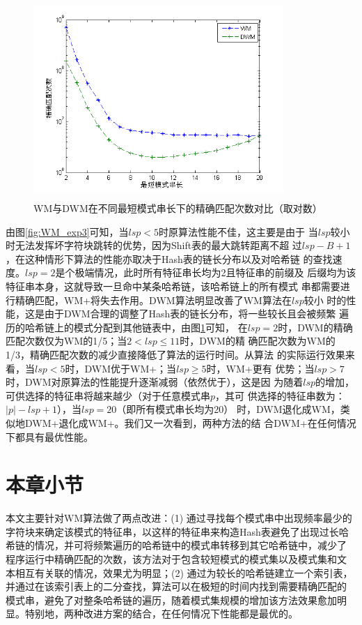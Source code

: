 \begin{figure}[H]
  \centering
  \includegraphics[height=7.5cm ,width=9.5cm]{figures/5_WM/WM_exp4.png}
  \caption{WM与DWM在不同最短模式串长下的精确匹配次数对比（取对数）}
  \label{fig:WM_exp4}
\end{figure}

由图\ref{fig:WM_exp3}可知，当$lsp<5$时原算法性能不佳，这主要是由于
当$lsp$较小时无法发挥坏字符块跳转的优势，因为Shift表的最大跳转距离不超
过$lsp-B+1$，在这种情形下算法的性能亦取决于Hash表的链长分布以及对哈希链
的查找速度。$lsp=2$是个极端情况，此时所有特征串长均为2且特征串的前缀及
后缀均为该特征串本身，这就导致一旦命中某条哈希链，该哈希链上的所有模式
串都需要进行精确匹配，WM+将失去作用。DWM算法明显改善了WM算法在$lsp$较小
时的性能，这是由于DWM合理的调整了Hash表的链长分布，将一些较长且会被频繁
遍历的哈希链上的模式分配到其他链表中，由图\ref{fig:WM_exp4}可知，
在$lsp=2$时，DWM的精确匹配次数仅为WM的1/5；当$2<lsp\leq 11$时，DWM的精
确匹配次数为WM的1/3，精确匹配次数的减少直接降低了算法的运行时间。从算法
的实际运行效果来看，当$lsp<5$时，DWM优于WM+；当$lsp \geq 5$时，WM+更有
优势；当$lsp > 7$时，DWM对原算法的性能提升逐渐减弱（依然优于），这是因
为随着$lsp$的增加，可供选择的特征串将越来越少（对于任意模式串$p$，其可
供选择的特征串数为：$|p|-lsp+1$），当$lsp=20$（即所有模式串长均为20）
时，DWM退化成WM，类似地DWM+退化成WM+。我们又一次看到，两种方法的结
合DWM+在任何情况下都具有最优性能。

\section{本章小节}
\label{sec:5_conclusion}

本文主要针对WM算法做了两点改进：(1) 通过寻找每个模式串中出现频率最少的
字符块来确定该模式的特征串，以这样的特征串来构造Hash表避免了出现过长哈
希链的情况，并可将频繁遍历的哈希链中的模式串转移到其它哈希链中，减少了
程序运行中精确匹配的次数，该方法对于包含较短模式的模式集以及模式集和文
本相互有关联的情况，效果尤为明显；(2) 通过为较长的哈希链建立一个索引表，
并通过在该索引表上的二分查找，算法可以在极短的时间内找到需要精确匹配的
模式串，避免了对整条哈希链的遍历，随着模式集规模的增加该方法效果愈加明
显。特别地，两种改进方案的结合，在任何情况下性能都是最优的。
